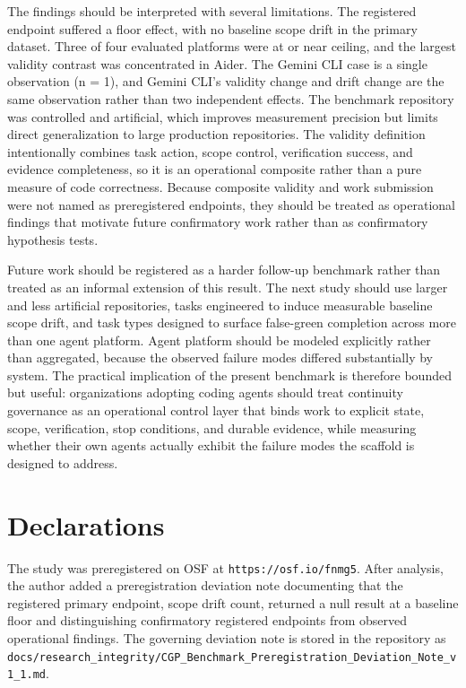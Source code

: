 \documentclass[11pt]{article}
\begin{document}
The findings should be interpreted with several limitations. The registered endpoint suffered a floor effect, with no baseline scope drift in the primary dataset. Three of four evaluated platforms were at or near ceiling, and the largest validity contrast was concentrated in Aider. The Gemini CLI case is a single observation (n = 1), and Gemini CLI's validity change and drift change are the same observation rather than two independent effects. The benchmark repository was controlled and artificial, which improves measurement precision but limits direct generalization to large production repositories. The validity definition intentionally combines task action, scope control, verification success, and evidence completeness, so it is an operational composite rather than a pure measure of code correctness. Because composite validity and work submission were not named as preregistered endpoints, they should be treated as operational findings that motivate future confirmatory work rather than as confirmatory hypothesis tests.

Future work should be registered as a harder follow-up benchmark rather than treated as an informal extension of this result. The next study should use larger and less artificial repositories, tasks engineered to induce measurable baseline scope drift, and task types designed to surface false-green completion across more than one agent platform. Agent platform should be modeled explicitly rather than aggregated, because the observed failure modes differed substantially by system. The practical implication of the present benchmark is therefore bounded but useful: organizations adopting coding agents should treat continuity governance as an operational control layer that binds work to explicit state, scope, verification, stop conditions, and durable evidence, while measuring whether their own agents actually exhibit the failure modes the scaffold is designed to address.

\section{Declarations}
The study was preregistered on OSF at \texttt{https://osf.io/fnmg5}. After analysis, the author added a preregistration deviation note documenting that the registered primary endpoint, scope drift count, returned a null result at a baseline floor and distinguishing confirmatory registered endpoints from observed operational findings. The governing deviation note is stored in the repository as \texttt{docs/research\_integrity/CGP\_Benchmark\_Preregistration\_Deviation\_Note\_v1\_1.md}.
\end{document}
